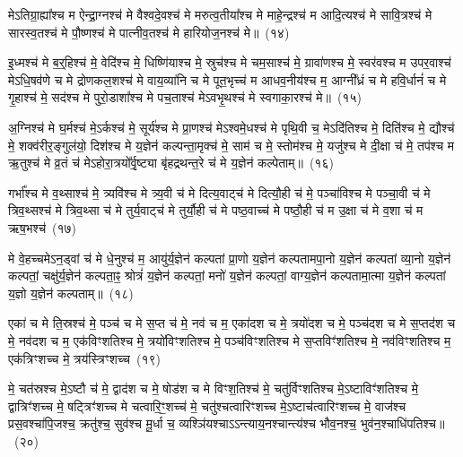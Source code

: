 मे\-ऽतिग्रा॒ह्या᳚श्च म ऐन्द्रा॒ग्नश्च॑ मे वैश्वदे॒वश्च॑ मे मरुत्व॒तीया᳚श्च मे माहे॒न्द्रश्च॑ म आदि॒त्यश्च॑ मे सावि॒त्रश्च॑ मे सारस्व॒तश्च॑ मे पौ॒ष्णश्च॑ मे पात्नीव॒तश्च॑ मे हारियोज॒नश्च॑ मे॥~(१४)\ip

{\anuvakamend[{ऋ॒तु॒ग्र॒हाश्च॒ चतु॑स्त्रिꣳशच्च}]}

इ॒ध्मश्च॑ मे ब॒र्॒\mbox{}हिश्च॑ मे॒ वेदि॑श्च मे॒ धिष्णि॑याश्च मे॒ स्रुच॑श्च मे चम॒साश्च॑ मे॒ ग्रावा॑णश्च मे॒ स्वर॑वश्च म उपर॒वाश्च॑ मे\-ऽधि॒षव॑णे च मे द्रोणकल॒शश्च॑ मे वाय॒व्या॑नि च मे पूत॒भृच्च॑ म आधव॒नीय॑श्च म॒ आग्नी᳚ध्रं च मे हवि॒र्धानं॑ च मे गृ॒हाश्च॑ मे॒ सद॑श्च मे पुरो॒डाशा᳚श्च मे पच॒ताश्च॑ मे\-ऽवभृ॒थश्च॑ मे स्वगाका॒रश्च॑ मे॥~(१५)\ip

{\anuvakamend[{गृ॒हाश्च॒ षोड॑श च}]}

अ॒ग्निश्च॑ मे घ॒र्मश्च॑ मे॒\-ऽर्कश्च॑ मे॒ सूर्य॑श्च मे प्रा॒णश्च॑ मे\-ऽश्वमे॒धश्च॑ मे पृथि॒वी च॒ मे\-ऽदि॑तिश्च मे॒ दिति॑श्च मे॒ द्यौश्च॑ मे॒ शक्व॑रीर॒ङ्गुल॑यो॒ दिश॑श्च मे य॒ज्ञेन॑ कल्पन्ता॒मृक्च॑ मे॒ साम॑ च मे॒ स्तोम॑श्च मे॒ यजु॑श्च मे दी॒क्षा च॑ मे॒ तप॑श्च म ऋ॒तुश्च॑ मे व्र॒तं च॑ मे\-ऽहोरा॒त्रयो᳚र्वृ॒ष्ट्या बृ॑हद्रथन्त॒रे च॑ मे य॒ज्ञेन॑ कल्पेताम्॥~(१६)\ip

{\anuvakamend[{दी॒क्षा\-ऽष्टाद॑श च}]}

गर्भा᳚श्च मे व॒थ्साश्च॑ मे॒ त्र्यवि॑श्च मे त्र्य॒वी च॑ मे दित्य॒वाट्च॑ मे दित्यौ॒ही च॑ मे॒ पञ्चा॑विश्च मे पञ्चा॒वी च॑ मे त्रिव॒थ्सश्च॑ मे त्रिव॒थ्सा च॑ मे तुर्य॒वाट्च॑ मे तुर्यौ॒ही च॑ मे पष्ठ॒वाच्च॑ मे पष्ठौ॒ही च॑ म उ॒क्षा च॑ मे व॒शा च॑ म ऋष॒भश्च॑~(१७)\ip

मे वे॒हच्चमे\-ऽन॒ड्वां च॑ मे धे॒नुश्च॑ म॒ आयु॑र्य॒ज्ञेन॑ कल्पतां प्रा॒णो य॒ज्ञेन॑ कल्पतामपा॒नो य॒ज्ञेन॑ कल्पतां व्या॒नो य॒ज्ञेन॑ कल्पतां॒ चक्षु॑र्य॒ज्ञेन॑ कल्पता॒ꣴ॒ श्रोत्रं॑ य॒ज्ञेन॑ कल्पतां॒ मनो॑ य॒ज्ञेन॑ कल्पतां॒ वाग्य॒ज्ञेन॑ कल्पतामा॒त्मा य॒ज्ञेन॑ कल्पतां य॒ज्ञो य॒ज्ञेन॑ कल्पताम्॥~(१८)\ip

{\anuvakamend[{ऋ॒ष॒भश्च॑ चत्वारि॒ꣳ॒शच्च॑}]}%

एका॑ च मे ति॒स्रश्च॑ मे॒ पञ्च॑ च मे स॒प्त च॑ मे॒ नव॑ च म॒ एका॑\-दश च मे॒ त्रयो॑दश च मे॒ पञ्च॑दश च मे स॒प्तद॑श च मे॒ नव॑दश च म॒ एक॑विꣳशतिश्च मे॒ त्रयो॑विꣳशतिश्च मे॒ पञ्च॑विꣳशतिश्च मे स॒प्तविꣳ॑शतिश्च मे॒ नव॑विꣳशतिश्च म॒ एक॑त्रिꣳशच्च मे॒ त्रय॑स्त्रिꣳशच्च~(१९)\ip

मे॒ चत॑स्रश्च मे॒\-ऽष्टौ च॑ मे॒ द्वाद॑श च मे॒ षोड॑श च मे विꣳश॒तिश्च॑ मे॒ चतु॑र्विꣳशतिश्च मे॒\-ऽष्टाविꣳ॑शतिश्च मे॒ द्वात्रिꣳ॑शच्च मे॒ षट्त्रिꣳ॑शच्च मे चत्वारि॒ꣳ॒शच्च॑ मे॒ चतु॑श्चत्वारिꣳशच्च मे॒\-ऽष्टाच॑त्वारिꣳशच्च मे॒ वाज॑श्च प्रस॒वश्चा॑पि॒जश्च॒ क्रतु॑श्च॒ सुव॑श्च मू॒र्धा च॒ व्यश्ञि॑यश्चा\-ऽऽ\-न्त्याय॒नश्चान्त्य॑श्च भौव॒नश्च॒ भुव॑न॒श्चाधि॑\-पतिश्च॥~(२०)\ip


